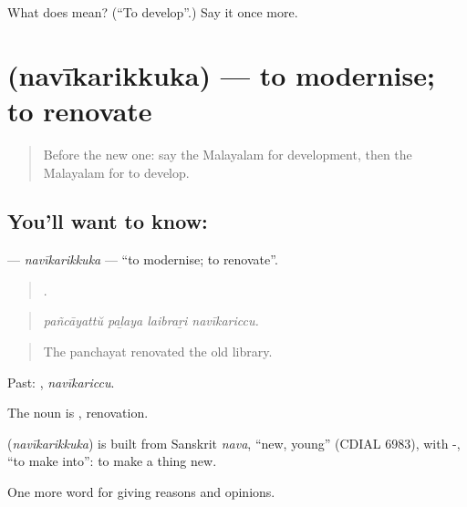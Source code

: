 \begin{tcolorbox}[breakable,colback=teal!4,colframe=teal!35!black,title={Before you move on}]
What does  mean? (\textquotedblleft{}To develop\textquotedblright{}.) Say it once more.
\end{tcolorbox}
\section[\texorpdfstring{\ml{നവീകരിക്കുക} (navīkarikkuka)}{നവീകരിക്കുക (navīkarikkuka)}]{ (navīkarikkuka) — to modernise; to renovate}

\label{lesson:ML-C431-navikarikkuka}



\begin{quote}
Before the new one: say the Malayalam for development, then the Malayalam for to develop.
\end{quote}

\subsection*{You'll want to know: }
\textbf{} — \emph{navīkarikkuka} — \textquotedblleft{}to modernise; to renovate\textquotedblright{}.

\begin{quote}
   .
\end{quote}

\begin{quote}
\emph{pañcāyattŭ paḻaya laibraṟi navīkariccu.}
\end{quote}

\begin{quote}
The panchayat renovated the old library.
\end{quote}

Past: , \emph{navīkariccu}.

The noun is , renovation.

\begin{cousinweb}
\textbf{} (\emph{navīkarikkuka}) is built from Sanskrit \emph{nava}, \textquotedblleft{}new, young\textquotedblright{} (CDIAL 6983), with -, \textquotedblleft{}to make into\textquotedblright{}: to make a thing new.
\end{cousinweb}

\begin{grammarlens}[title={What you've built}]
One more word for giving reasons and opinions.
\end{grammarlens}

